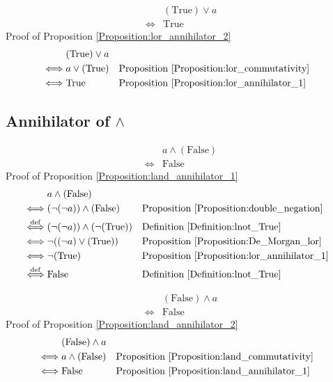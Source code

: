 \begin{prop}
\label{Proposition:lor_annihilator_2}
\begin{align*}
& (\text{True}) \lor a \\
\iff & \text{True}
\end{align*}
Proof of Proposition \ref{Proposition:lor_annihilator_2}
\begin{align*}
& (\text{True}) \lor a \\
\iff & a \lor (\text{True})
& & \text{Proposition \ref{Proposition:lor_commutativity}} \\
\iff & \text{True}
& & \text{Proposition \ref{Proposition:lor_annihilator_1}} \\
\end{align*}
\end{prop}

\subsection{Annihilator of $\land$}
\begin{prop}
\label{Proposition:land_annihilator_1}
\begin{align*}
& a \land (\text{False}) \\
\iff & \text{False}
\end{align*}
Proof of Proposition \ref{Proposition:land_annihilator_1}
\begin{align*}
& a \land (\text{False}) \\
\iff & (\lnot (\lnot a)) \land (\text{False})
& & \text{Proposition \ref{Proposition:double_negation}} \\
\overset{\operatorname{def}}{\iff} & (\lnot (\lnot a)) \land (\lnot (\text{True}))
& & \text{Definition \ref{Definition:lnot_True}} \\
\iff & \lnot ((\lnot a) \lor (\text{True}))
& & \text{Proposition \ref{Proposition:De_Morgan_lor}} \\
\iff & \lnot (\text{True})
& & \text{Proposition \ref{Proposition:lor_annihilator_1}} \\
\overset{\operatorname{def}}{\iff} & \text{False}
& & \text{Definition \ref{Definition:lnot_True}} \\
\end{align*}
\end{prop}

\begin{prop}
\label{Proposition:land_annihilator_2}
\begin{align*}
& (\text{False}) \land a \\
\iff & \text{False}
\end{align*}
Proof of Proposition \ref{Proposition:land_annihilator_2}
\begin{align*}
& (\text{False}) \land a \\
\iff & a \land (\text{False})
& & \text{Proposition \ref{Proposition:land_commutativity}} \\
\iff & \text{False}
& & \text{Proposition \ref{Proposition:land_annihilator_1}} \\
\end{align*}
\end{prop}

